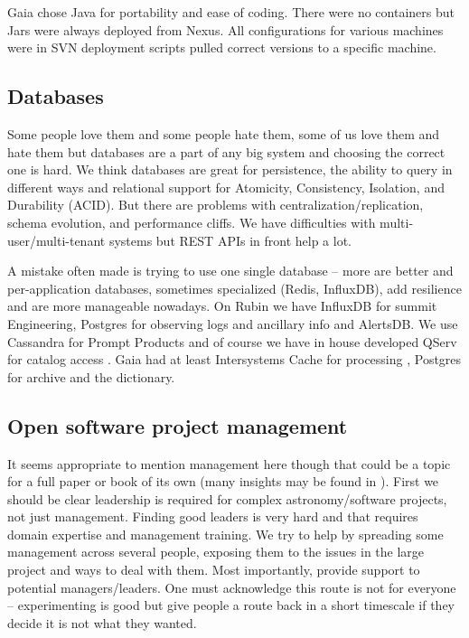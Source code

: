 \documentclass[11pt,twoside]{article}
\begin{document}
Gaia chose Java for portability and ease of coding.
There were no containers but Jars were always deployed from Nexus.
All configurations for various machines were in SVN  deployment scripts pulled correct versions to a specific machine.

\subsection{Databases}
Some people love them and some people hate them, some of us love them and hate them but databases are a part of any big system and choosing the correct one is hard.
We think databases are great for persistence, the ability to query in different ways and relational support for Atomicity, Consistency, Isolation, and Durability (ACID).
But there are problems with centralization/replication, schema evolution, and performance cliffs.
We have  difficulties with multi-user/multi-tenant systems but
REST APIs in front help a lot.

A mistake often made is trying to use one single database --
more are better and per-application databases, sometimes specialized (Redis, InfluxDB), add resilience and are more manageable nowadays.
On Rubin we have InfluxDB for summit Engineering, Postgres for observing logs and ancillary info and AlertsDB.
We use Cassandra for Prompt Products and of course we have in house developed QServ for catalog access \citep{C15_adassxxxii}.
Gaia had at least Intersystems Cache for processing \citep{2011ExA....31..215O}, Postgres for archive and the dictionary.

\subsection{Open software project management}
It seems appropriate to mention management here though that could be a topic for a full paper or book of its own
(many insights may be found in \citet{OMULLANE2005}).
First we should be clear leadership is required for complex astronomy/software projects, not just management.
Finding good leaders is very hard and that requires domain expertise and management training.
We try to help by spreading some management across several people, exposing them to the issues in the large project and ways to deal with them.
Most importantly, provide support to potential managers/leaders.
One must  acknowledge this route is not for everyone  -- experimenting is good but give people a route back in a short timescale if they decide it is not what  they wanted.
\end{document}
